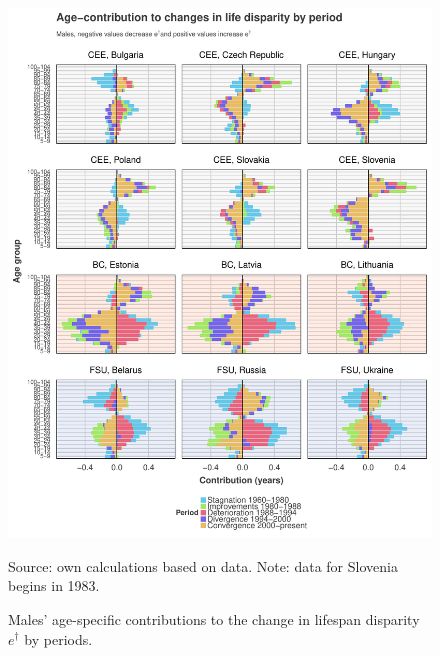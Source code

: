 \documentclass{article}
\begin{document}
\begin{figure}[h!]
\caption{Males' age-specific contributions to the change in lifespan disparity $e^\dagger$ by periods.}
\label{MalesDecomp}
\centering
\begin{center}
\includegraphics[scale=.52]{Figures/Age_ed_decomp_Males.pdf}
\end{center}
Source: own calculations based on \citet{HMD} data. Note: data for Slovenia begins in 1983.
\end{figure}

\newpage
\end{document}
